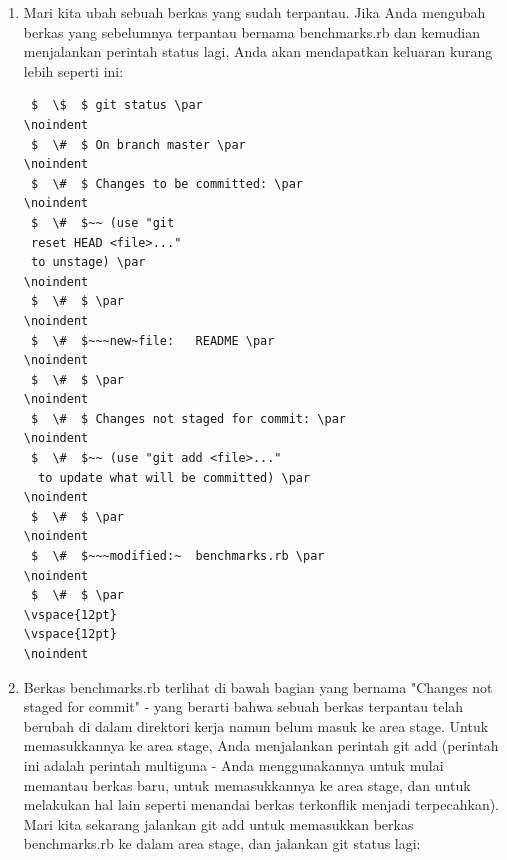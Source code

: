 \begin{enumerate}
\item Mari kita ubah sebuah berkas yang sudah terpantau. Jika Anda mengubah berkas yang sebelumnya terpantau bernama benchmarks.rb dan kemudian menjalankan perintah status lagi, Anda akan mendapatkan keluaran kurang lebih seperti ini: \par
\vspace{12pt}
\noindent 
\begin{verbatim}
 $  \$  $ git status \par
\noindent 
 $  \#  $ On branch master \par
\noindent 
 $  \#  $ Changes to be committed: \par
\noindent 
 $  \#  $~~ (use "git 
 reset HEAD <file>..." 
 to unstage) \par
\noindent 
 $  \#  $ \par
\noindent 
 $  \#  $~~~new~file:   README \par
\noindent 
 $  \#  $ \par
\noindent 
 $  \#  $ Changes not staged for commit: \par
\noindent 
 $  \#  $~~ (use "git add <file>..."
  to update what will be committed) \par
\noindent 
 $  \#  $ \par
\noindent 
 $  \#  $~~~modified:~  benchmarks.rb \par
\noindent 
 $  \#  $ \par
\vspace{12pt}
\vspace{12pt}
\noindent 
 \end{verbatim}

\item Berkas benchmarks.rb terlihat di bawah bagian yang bernama "Changes not staged for commit" - yang berarti bahwa sebuah berkas terpantau telah berubah di dalam direktori kerja namun belum masuk ke area stage. Untuk memasukkannya ke area stage, Anda menjalankan perintah git add (perintah ini adalah perintah multiguna - Anda menggunakannya untuk mulai memantau berkas baru, untuk memasukkannya ke area stage, dan untuk melakukan hal lain seperti menandai berkas terkonflik menjadi terpecahkan). Mari kita sekarang jalankan git add untuk memasukkan berkas benchmarks.rb ke dalam area stage, dan jalankan git status lagi: \par
\vspace{12pt}
\noindent 

\begin{verbatim}



\end{verbatim}
\end{enumerate}
